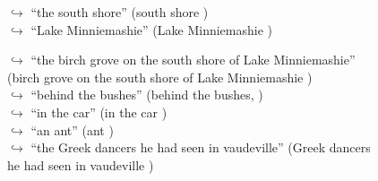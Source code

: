 \documentclass[11pt,a4paper, onecolumn]{article}
\begin{document}
\begin{figure}[t]
\begin{tcolorbox}[boxsep=0pt,left=5pt,right=0pt,top=2pt,colback = yellow!5]
\begin{dialogue}
\colorbox{pink!25}{$\hookrightarrow$}
{ ``the south shore'' (south shore ) }
\\
\colorbox{pink!25}{$\hookrightarrow$}
{ ``Lake Minniemashie'' (Lake Minniemashie ) }
\\
 \end{dialogue}\end{tcolorbox}\end{figure}\begin{figure}[t] \small \begin{tcolorbox}[boxsep=0pt,left=5pt,right=0pt,top=2pt,colback = yellow!5] \begin{dialogue}
 \small 
\colorbox{pink!25}{$\hookrightarrow$}
{ ``the birch grove on the south shore of Lake Minniemashie'' (birch grove on the south shore of Lake Minniemashie ) }
\\
\colorbox{pink!25}{$\hookrightarrow$}
{ ``behind the bushes'' (behind the bushes, ) }
\\
\colorbox{pink!25}{$\hookrightarrow$}
{ ``in the car'' (in the car ) }
\\
\colorbox{pink!25}{$\hookrightarrow$}
{ ``an ant'' (ant ) }
\\
\colorbox{pink!25}{$\hookrightarrow$}
{ ``the Greek dancers he had seen in vaudeville'' (Greek dancers he had seen in vaudeville ) }
\\
 \end{dialogue}\end{tcolorbox}\end{figure}
\end{document}
